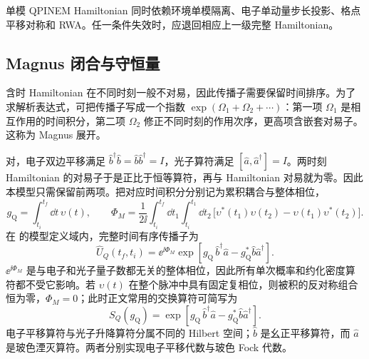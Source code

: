 单模 QPINEM Hamiltonian 同时依赖环境单模隔离、电子单动量步长投影、格点平移对称和 RWA。任一条件失效时，应退回相应上一级完整 Hamiltonian。

\subsection{Magnus 闭合与守恒量}

含时 Hamiltonian 在不同时刻一般不对易，因此传播子需要保留时间排序。为了求解析表达式，可把传播子写成一个指数 $\exp(\Omega_1+\Omega_2+\cdots)$：第一项 $\Omega_1$ 是相互作用的时间积分，第二项 $\Omega_2$ 修正不同时刻的作用次序，更高项含嵌套对易子。这称为 Magnus 展开。

对，电子双边平移满足 $\hat b^\dagger\hat b=\hat b\hat b^\dagger=I$，光子算符满足 $[\hat a,\hat a^\dagger]=I$。两时刻 Hamiltonian 的对易子于是正比于恒等算符，再与 Hamiltonian 对易就为零。因此本模型只需保留前两项。把对应时间积分分别记为累积耦合与整体相位，
\begin{equation}
\boxed{
g_{\mathrm Q}=\int_{t_i}^{t_f}\dd t\,\upsilon(t),
\qquad
\Phi_M
=\frac{1}{2\ii}
\int_{t_i}^{t_f}\dd t_1
\int_{t_i}^{t_1}\dd t_2\,
\bigl[\upsilon^*(t_1)\upsilon(t_2)-\upsilon(t_1)\upsilon^*(t_2)\bigr].}
\label{eq:qpinem-magnus-pulse-parameters-dp68}
\end{equation}
在 的模型定义域内，完整时间有序传播子为
\begin{equation}
\boxed{
\hat U_Q(t_f,t_i)
=\ee^{\ii\Phi_M}
\exp[g_{\mathrm Q}\,\hat b^\dagger\hat a-g_{\mathrm Q}^*\hat b\hat a^\dagger].}
\label{eq:qpinem-magnus-exact-dp68}
\end{equation}
$\ee^{\ii\Phi_M}$ 是与电子和光子量子数都无关的整体相位，因此所有单次概率和约化密度算符都不受它影响。若 $\upsilon(t)$ 在整个脉冲中具有固定复相位，则被积的反对称组合恒为零，$\Phi_M=0$；此时正文常用的交换算符可简写为
\begin{equation}
\boxed{
S_Q(g_{\mathrm Q})=\exp[g_{\mathrm Q}\,\hat b^\dagger\hat a-g_{\mathrm Q}^*\hat b\hat a^\dagger].}
\label{eq:qpinem_S}
\end{equation}
电子平移算符与光子升降算符分属不同的 Hilbert 空间；$\hat b$ 是幺正平移算符，而 $\hat a$ 是玻色湮灭算符。两者分别实现电子平移代数与玻色 Fock 代数。

